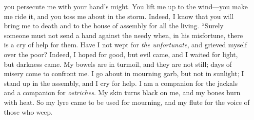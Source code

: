 \begin{biblechapter}
you persecute me with your hand’s might.
\verse You lift me up to the wind—you make me ride it, 
and you toss me about in the storm.
\verse Indeed, I know that you will bring me to death 
and to the house of assembly for all the living.
\verse “Surely someone must not send a hand against the needy 
when, in his misfortune, there is a cry of help for them.
\verse Have I not wept for \textit{the unfortunate}, 
and grieved myself over the poor?
\verse Indeed, I hoped for good, but evil came, 
and I waited for light, but darkness came.
\verse My bowels are in turmoil, and they are not still; 
days of misery come to confront me.
\verse I go about in mourning garb, but not in sunlight; 
I stand up in the assembly, and I cry for help.
\verse I am a companion for the jackals 
and a companion for \textit{ostriches}.
\verse My skin turns black on me, 
and my bones burn with heat.
\verse So my lyre came to be used for mourning, 
and my flute for the voice of those who weep.
\end{biblechapter}

